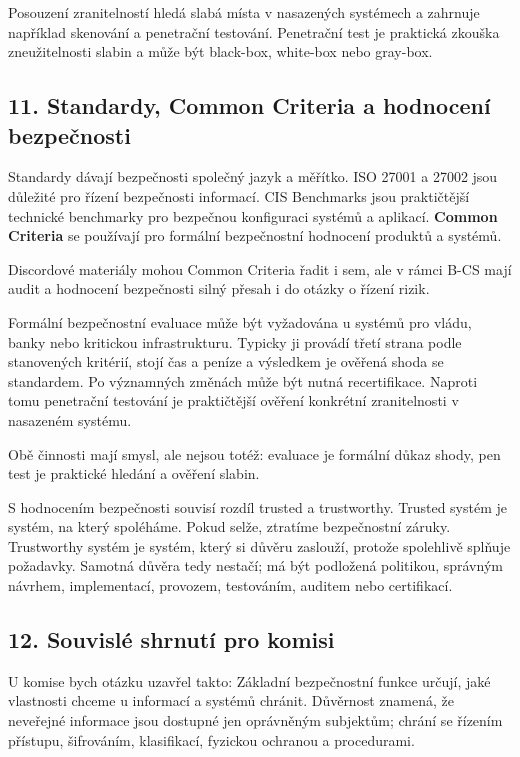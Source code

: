 Posouzení zranitelností hledá slabá místa v nasazených systémech a zahrnuje například skenování a penetrační testování. Penetrační test je praktická zkouška zneužitelnosti slabin a může být black-box, white-box nebo gray-box.

\subsection*{11. Standardy, Common Criteria a hodnocení bezpečnosti}

Standardy dávají bezpečnosti společný jazyk a měřítko. ISO 27001 a 27002 jsou důležité pro řízení bezpečnosti informací. CIS Benchmarks jsou praktičtější technické benchmarky pro bezpečnou konfiguraci systémů a aplikací. \textbf{Common Criteria} se používají pro formální bezpečnostní hodnocení produktů a systémů.

Discordové materiály mohou Common Criteria řadit i sem, ale v rámci B-CS mají audit a hodnocení bezpečnosti silný přesah i do otázky o řízení rizik.

Formální bezpečnostní evaluace může být vyžadována u systémů pro vládu, banky nebo kritickou infrastrukturu. Typicky ji provádí třetí strana podle stanovených kritérií, stojí čas a peníze a výsledkem je ověřená shoda se standardem. Po významných změnách může být nutná recertifikace. Naproti tomu penetrační testování je praktičtější ověření konkrétní zranitelnosti v nasazeném systému.

Obě činnosti mají smysl, ale nejsou totéž: evaluace je formální důkaz shody, pen test je praktické hledání a ověření slabin.

S hodnocením bezpečnosti souvisí rozdíl trusted a trustworthy. Trusted systém je systém, na který spoléháme. Pokud selže, ztratíme bezpečnostní záruky. Trustworthy systém je systém, který si důvěru zaslouží, protože spolehlivě splňuje požadavky. Samotná důvěra tedy nestačí; má být podložená politikou, správným návrhem, implementací, provozem, testováním, auditem nebo certifikací.

\subsection*{12. Souvislé shrnutí pro komisi}

U komise bych otázku uzavřel takto: Základní bezpečnostní funkce určují, jaké vlastnosti chceme u informací a systémů chránit. Důvěrnost znamená, že neveřejné informace jsou dostupné jen oprávněným subjektům; chrání se řízením přístupu, šifrováním, klasifikací, fyzickou ochranou a procedurami.

